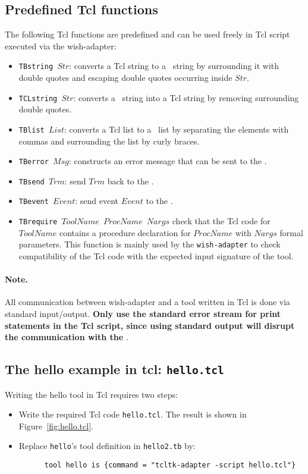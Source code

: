 \subsection{\label{TclTk-functions}Predefined Tcl functions}
The following Tcl functions are predefined and can be used freely in Tcl
script executed via the wish-adapter:
\begin{itemize}
\item {\tt TBstring $Str$\/}: converts a Tcl string to a \TB\ string by
surrounding it with double quotes and escaping double quotes occurring
inside $Str$.

\item {\tt TCLstring $Str$\/}: converts a \TB\ string into  a Tcl string
by removing surrounding double quotes.

\item {\tt TBlist $List$\/}: converts a Tcl list to a \TB\ list by
separating the elements with commas and surrounding the list by
curly braces.

\item {\tt TBerror $Msg$\/}: constructs an error message that can be sent
to the \TB.

\item {\tt TBsend $Trm$\/}: send $Trm$ back to the \TB.

\item {\tt TBevent $Event$\/}: send event $Event$ to the \TB.

\item {\tt TBrequire $ToolName$ $ProcName$ $Nargs$} check
that the Tcl code for $ToolName$ contains a procedure declaration
for $ProcName$ with $Nargs$ formal parameters.
This function is mainly used by the {\tt wish-adapter} to check
compatibility of the Tcl code with the expected input
signature of the tool.
\end{itemize}

\paragraph{Note.} All communication between wish-adapter and a
 tool written in Tcl is done via standard input/output. {\bf Only use
the standard error stream for print statements in the Tcl script,
since using standard output will disrupt the communication with the
\TB}.

\subsection{\label{Ex-hello2.tcl}The hello example in tcl: {\tt hello.tcl}}

Writing the hello tool in Tcl requires two steps:
\begin{itemize}
\item Write the required Tcl code {\tt hello.tcl}. The result is shown in Figure~\ref{fig:hello.tcl}.
\item Replace {\tt hello}'s tool definition in {\tt hello2.tb} by:
\begin{verbatim}
      tool hello is {command = "tcltk-adapter -script hello.tcl"}
\end{verbatim}
\end{itemize}
